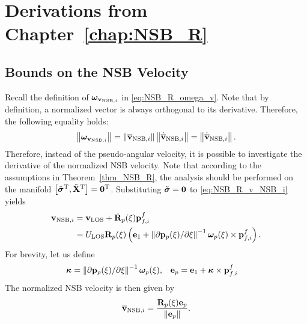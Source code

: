 \chapter{Derivations from Chapter~\ref{chap:NSB_R}}
\label{app:NSB_R}

\section{Bounds on the NSB Velocity}
\label{app:v_NSB}
Recall the definition of $\bm{\omega}_{\mathbf{v}_{{\rm NSB},i}}$ in \eqref{eq:NSB_R_omega_v}.
Note that by definition, a normalized vector is always orthogonal to its derivative.
Therefore, the following equality holds:
\begin{equation}
    \left\|\bm{\omega}_{\mathbf{v}_{{\rm NSB}, i}}\right\| = \left\|\overline{\mathbf{v}}_{{\rm NSB}, i}\right\|\left\|\dot{\overline{\mathbf{v}}}_{{\rm NSB}, i}\right\|
    = \left\|\dot{\overline{\mathbf{v}}}_{{\rm NSB}, i}\right\|.
\end{equation}
Therefore, instead of the pseudo-angular velocity, it is possible to investigate the derivative of the normalized NSB velocity.
Note that according to the assumptions in Theorem~\ref{thm_NSB_R}, the analysis should be performed on the manifold $\left[\tilde{\bm{\sigma}}^{\mathrm{T}}, \tilde{\mathbf{X}}^{\mathrm{T}}\right] = \mathbf{0}^{\mathrm{T}}$.
Substituting $\tilde{\bm{\sigma}} = \mathbf{0}$ to \eqref{eq:NSB_R_v_NSB_i} yields
\begin{equation}
    \begin{split}
        \mathbf{v}_{{\rm NSB}, i} &= \mathbf{v}_{\rm LOS} + \dot{\mathbf{R}}_p(\xi)\mathbf{p}_{f,i}^f \\
        &= U_{\rm LOS}\mathbf{R}_p(\xi) \left(\mathbf{e}_1 + \left\|\partial \mathbf{p}_p(\xi) / \partial \xi\right\|^{-1}\bm{\omega}_p(\xi) \times \mathbf{p}_{f,i}^f\right).
    \end{split}
    \label{eq:NSB_R_v_NSB_i_nominal}
\end{equation}
For brevity, let us define
\begin{align}
    \bm{\kappa} &= \left\|\partial \mathbf{p}_p(\xi) / \partial \xi\right\|^{-1}\bm{\omega}_p(\xi), &
    \mathbf{e}_p &= \mathbf{e}_1 + \bm{\kappa} \times \mathbf{p}_{f,i}^f
\end{align}
The normalized NSB velocity is then given by
\begin{equation}
    \overline{\mathbf{v}}_{{\rm NSB}, i} = \frac{\mathbf{R}_p(\xi) \mathbf{e}_p}{\left\|\mathbf{e}_p\right\|}.
    \label{eq:NSB_R_v_NSB_i_normalized}
\end{equation}
